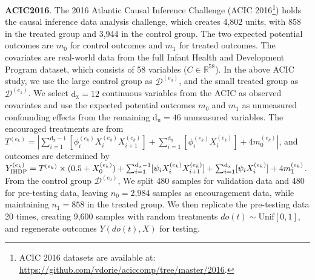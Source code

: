 \documentclass[journal]{IEEEtran}
\begin{document}
\textbf{ACIC2016}. 
The 2016 Atlantic Causal Inference Challenge (ACIC 2016\footnote{ACIC 2016 datasets are available at: \url{https://github.com/vdorie/aciccomp/tree/master/2016}.}) \cite{dorie2019automated} holds the causal inference data analysis challenge, which creates 4,802 units, with 858 in the treated group and 3,944 in the control group.
The two expected potential outcomes are $m_0$ for control outcomes and $m_1$ for treated outcomes. 
The covariates are real-world data from the full Infant Health and Development Program dataset, which consists of 58 variables ($C \in \mathbb{R}^{58}$).
In the above ACIC study, we use the large control group as $\mathcal{D}^{(e_0)}$, and the small treated group as $\mathcal{D}^{(e_1)}$. We select $\text{d}_\text{x} =12$ continuous variables from the ACIC as observed covariates and use the expected potential outcomes $m_0$ and $m_1$ as unmeasured confounding effects from the remaining $\text{d}_\text{u} = 46$ unmeasured variables. The encouraged treatments are from $T^{(e_k)} = | \sum_{i=1}^{\text{d}_\text{x}-1} [\phi_i^{(e_k)}X_i^{(e_k)} X_{i+1}^{(e_k)}] + \sum_{i=1}^{\text{d}_\text{x}} [\phi_{i}^{(e_k)}X_{i}^{(e_k)}] + 4m_0^{(e_k)} |$, and outcomes are determined by $Y^{(e_k)}_{\textsc{IHDP}} = T^{(e_k)} \times (0.5+X_0^{(e_k)}) + \sum_{i=1}^{\text{d}_\text{x}-1} [\psi_i X_i^{(e_k)} X_{i+1}^{(e_k)}] + \sum_{i=1}^{\text{d}_\text{x}} [\psi_i X_{i}^{(e_k)}] + 4m_1^{(e_k)}$. From the control group $\mathcal{D}^{(e_0)}$, We split 480 samples for validation data and 480 for pre-testing data, leaving $n_0 = \text{2,984}$ samples as encouragement data, while maintaining $n_1 = \text{858}$ in the treated group. We then replicate the pre-testing data 20 times, creating 9,600 samples with random treatments $do(t) \sim \text{Unif}[0, 1]$, and regenerate outcomes $Y(do(t),X)$ for testing.
\end{document}
